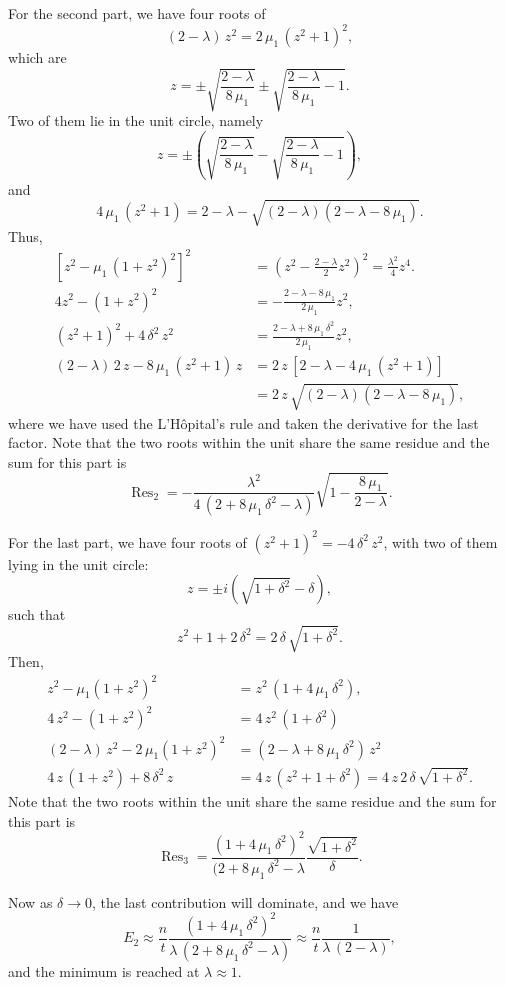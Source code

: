 \documentclass[reprint]{revtex4-1}
\newcommand{\Err}{E}
\begin{document}
{For the second part,
we have four roots of
$$
(2 - \lambda) \, z^2 = 2 \, \mu_1 \, (z^2 + 1)^2,
$$
which are
$$
z = \pm \sqrt { \frac{ 2 - \lambda }
                     { 8 \, \mu_1 } }
\pm \sqrt { \frac{ 2 - \lambda }
                 { 8 \, \mu_1 } - 1 }.
$$
Two of them lie in the unit circle, namely
$$
z = \pm \left(
  \sqrt { \frac{ 2 - \lambda }
               { 8 \, \mu_1 } }
- \sqrt { \frac{ 2 - \lambda }
               { 8 \, \mu_1 } - 1 }
        \right),
$$
and
$$
4 \, \mu_1 \, ( z^2 + 1)
=
2 - \lambda
-
\sqrt{ ( 2 - \lambda ) ( 2 - \lambda - 8 \, \mu_1 ) }.
$$
Thus,
$$
\begin{aligned}
\left[ z^2 - \mu_1 \, (1 + z^2)^2 \right]^2
&=
\left( z^2 - \tfrac{ 2 - \lambda } { 2 } z^2 \right)^2
=
\frac{ \lambda^2 } { 4 } z^4.
\\
%
4 z^2 - (1 + z^2)^2
&=
-\frac{ 2 - \lambda - 8 \, \mu_1  } { 2 \, \mu_1 } z^2,
\\
%
(z^2 + 1)^2 + 4 \, \delta^2 \, z^2
&=
\frac{ 2 - \lambda + 8 \, \mu_1 \, \delta^2 }
     { 2 \, \mu_1 }
     z^2,
\\
%
(2 - \lambda) \, 2 \, z
-
8 \, \mu_1 \, (z^2 + 1) \, z
&=
2 \, z \, \left[2 - \lambda - 4 \,  \mu_1 \, (z^2 + 1) \right]
\\
&= 2 \, z \, \sqrt{ (2 - \lambda) ( 2 - \lambda - 8 \, \mu_1 ) },
\end{aligned}
$$
where we have used the L'H\^{o}pital's rule
and taken the derivative for the last factor.
%
Note that the two roots within the unit share the same
residue and the sum for this part is
$$
\operatorname{Res}_2
=
-\frac{                 \lambda^2                     }
      { 4 \, ( 2 + 8 \, \mu_1 \, \delta^2 - \lambda ) }
\sqrt{ 1 - \frac{ 8 \, \mu_1 } { 2 - \lambda } }.
$$

For the last part,
we have four roots of
$(z^2 + 1)^2 = - 4 \, \delta^2 \, z^2$,
with two of them lying in the unit circle:
$$
z = \pm i \left( \sqrt{ 1 + \delta^2 } - \delta \right),
$$
such that
$$
z^2 + 1 + 2 \, \delta^2 = 2 \, \delta \, \sqrt{1 + \delta^2}.
$$
Then,
$$
\begin{aligned}
z^2 - \mu_1 (1 + z^2)^2
&= z^2 \, (1 + 4 \, \mu_1 \, \delta^2),
\\
4 \, z^2 - (1 + z^2)^2
&=
4 \, z^2 \, (1 + \delta^2)
\\
%
(2 - \lambda) \, z^2
- 2 \, \mu_1 (1 + z^2)^2
&=
\left(
  2 - \lambda + 8 \, \mu_1 \, \delta^2
\right) \, z^2
\\
%
4 \, z \, (1 + z^2)
+
8 \, \delta^2 \, z
&=
4 \, z \, (z^2 + 1 + \delta^2)
=
4 \, z \, 2 \, \delta \, \sqrt{ 1 + \delta^2 }.
\end{aligned}
$$
Note that the two roots within the unit share the same
residue and the sum for this part is
$$
\operatorname{Res}_3
=
\frac{ (1 + 4 \, \mu_1 \, \delta^2 )^2 }
     { (2 + 8 \, \mu_1 \, \delta^2 - \lambda }
\frac{ \sqrt{ 1 + \delta^2 } }
     {        \delta         }.
$$

Now as $\delta \to 0$, the last contribution will dominate,
and we have
$$
\Err_2
\approx
\frac{ n } { t }
\frac{ (1 + 4 \, \mu_1 \, \delta^2)^2 }
{ \lambda \, (2 + 8 \, \mu_1 \, \delta^2 - \lambda) }
\approx
\frac{ n } { t }
\frac{ 1 }
{ \lambda \, (2 - \lambda) },
$$
and the minimum is reached at $\lambda \approx 1$.
}
\end{document}
